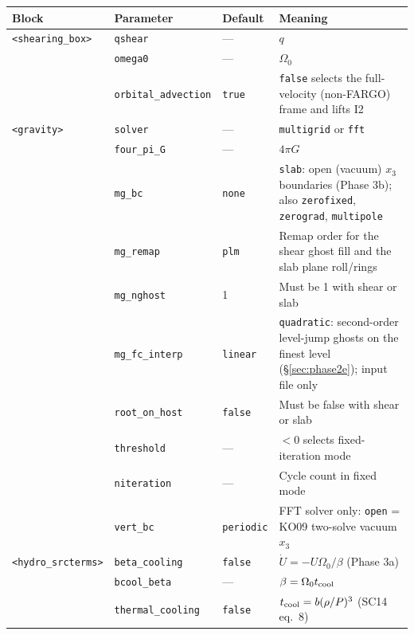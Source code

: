 \documentclass[11pt]{article}
\newcommand{\code}[1]{\texttt{#1}}
\newcommand{\Om}{\Omega_0}
\begin{document}
\begin{center}
\small
\begin{tabular}{@{}lllp{5.4cm}@{}}
\toprule
Block & Parameter & Default & Meaning \\
\midrule
\code{<shearing\_box>} & \code{qshear} & --- & $q$ \\
                       & \code{omega0} & --- & $\Om$ \\
                       & \code{orbital\_advection} & \code{true} & \code{false}
                         selects the full-velocity (non-FARGO) frame and lifts I2 \\
\midrule
\code{<gravity>} & \code{solver} & --- & \code{multigrid} or \code{fft} \\
                 & \code{four\_pi\_G} & --- & $4\pi G$ \\
                 & \code{mg\_bc} & \code{none} & \code{slab}: open (vacuum) $x_3$
                   boundaries (Phase 3b); also \code{zerofixed}, \code{zerograd},
                   \code{multipole} \\
                 & \code{mg\_remap} & \code{plm} & Remap order for the shear ghost
                   fill and the slab plane roll/rings \\
                 & \code{mg\_nghost} & 1 & Must be 1 with shear or slab \\
                 & \code{mg\_fc\_interp} & \code{linear} & \code{quadratic}: second-order
                   level-jump ghosts on the finest level (\S\ref{sec:phase2e}); input file only \\
                 & \code{root\_on\_host} & \code{false} & Must be false with shear
                   or slab \\
                 & \code{threshold} & --- & $<0$ selects fixed-iteration mode \\
                 & \code{niteration} & --- & Cycle count in fixed mode \\
                 & \code{vert\_bc} & \code{periodic} & FFT solver only:
                   \code{open} = KO09 two-solve vacuum $x_3$ \\
\midrule
\code{<hydro\_srcterms>} & \code{beta\_cooling} & \code{false} &
                   $\dot U = -U\Om/\beta$ (Phase 3a) \\
                 & \code{bcool\_beta} & --- & $\beta = \Om t_{\rm cool}$ \\
                 & \code{thermal\_cooling} & \code{false} &
                   $t_{\rm cool} = b(\rho/P)^3$ (SC14 eq.~8) \\

\end{tabular}
\end{center}
\end{document}
